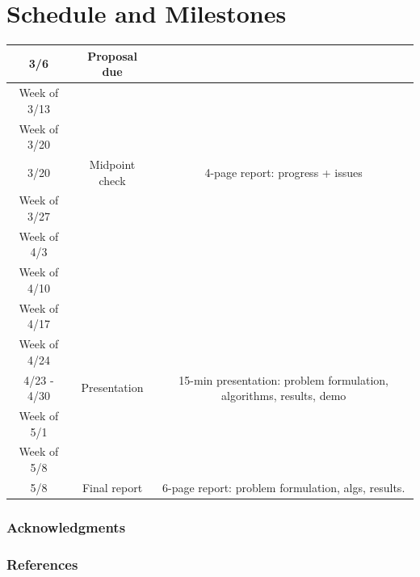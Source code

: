 \documentclass{article}
\begin{document}
\section{Schedule and Milestones}
\begin{tabular}{ |c|c|c| } 
 \hline
 3/6 & \cellcolor{red} Proposal due & \\
 \hline

 Week of 3/13 & &\\
 \hline
 Week of 3/20 & &\\
 \hline

 3/20 & \cellcolor{red} Midpoint check & 4-page report: progress + issues\\
 \hline

 Week of 3/27 & &\\
 \hline
 Week of 4/3 & &\\
 \hline
 Week of 4/10 & &\\
 \hline
 Week of 4/17 & &\\
 \hline
 Week of 4/24 & &\\
 \hline

 4/23 - 4/30 & \cellcolor{red} Presentation & 15-min presentation: problem formulation, algorithms, results, demo \\
 \hline

 Week of 5/1 & &\\
 \hline
 Week of 5/8 & &\\
 \hline

 5/8 & \cellcolor{red} Final report & 6-page report: problem formulation, algs, results. \\
 \hline
\end{tabular}

\subsubsection*{Acknowledgments}
\subsubsection*{References}
\end{document}
